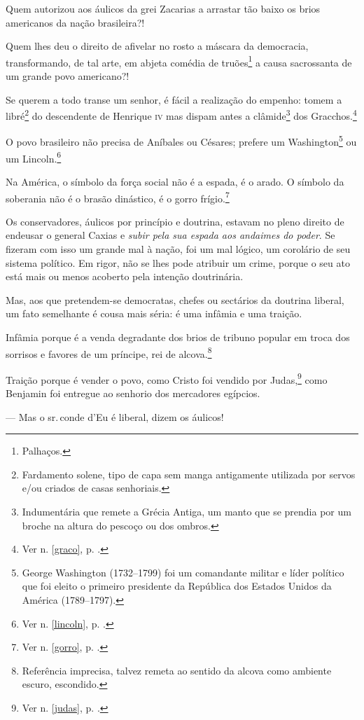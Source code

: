 Quem autorizou aos áulicos da grei Zacarias a arrastar tão baixo os
brios americanos da nação brasileira?!

Quem lhes deu o direito de afivelar no rosto a máscara da democracia,
transformando, de tal arte, em abjeta comédia de truões\footnote{
  Palhaços.} a causa sacrossanta de um grande povo americano?!

Se querem a todo transe um senhor, é fácil a realização do empenho:
tomem a libré\footnote{Fardamento solene, tipo de capa sem manga
  antigamente utilizada por servos e/ou criados de casas senhoriais.} do
descendente de Henrique \textsc{iv} mas dispam antes a clâmide\footnote{
  Indumentária que remete a Grécia Antiga, um manto que se prendia por
  um broche na altura do pescoço ou dos ombros.} dos
Gracchos.\footnote{Ver n. \ref{graco}, p. \pageref{graco}.}

O povo brasileiro não precisa de Aníbales ou Césares; prefere um
Washington\footnote{George Washington (1732--1799) foi um comandante
  militar e líder político que foi eleito o primeiro presidente da
  República dos Estados Unidos da América (1789--1797).} ou um
Lincoln.\footnote{Ver n. \ref{lincoln}, p. \pageref{lincoln}.}

Na América, o símbolo da força social não é a espada, é o arado. O
símbolo da soberania não é o brasão dinástico, é o gorro
frígio.\footnote{Ver n. \ref{gorro}, p. \pageref{gorro}.}

Os conservadores, áulicos por princípio e doutrina, estavam no pleno
direito de endeusar o general Caxias e \emph{subir pela sua espada aos
andaimes do poder}. Se fizeram com isso um grande mal à nação, foi um
mal lógico, um corolário de seu sistema político. Em rigor, não se lhes
pode atribuir um crime, porque o seu ato está mais ou menos acoberto
pela intenção doutrinária.

Mas, aos que pretendem-se democratas, chefes ou sectários da doutrina
liberal, um fato semelhante é cousa mais séria: é uma infâmia e uma
traição.

Infâmia porque é a venda degradante dos brios de tribuno popular em
troca dos sorrisos e favores de um príncipe, rei de alcova.\footnote{
  Referência imprecisa, talvez remeta ao sentido da alcova como ambiente
  escuro, escondido.}

Traição porque é vender o povo, como Cristo foi vendido por
Judas,\footnote{Ver n. \ref{judas}, p. \pageref{judas}.} como Benjamin foi
entregue ao senhorio dos mercadores egípcios.

--- Mas o sr.\,conde d'Eu é liberal, dizem os áulicos!

